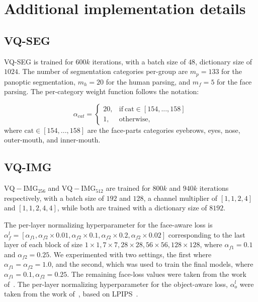 \documentclass[final]{cvpr}
\begin{document}
{\small


}
\clearpage
\appendix

\section{Additional implementation details}

\subsection{VQ-SEG}
VQ-SEG is trained for $600k$ iterations, with a batch size of $48$, dictionary size of $1024$. The number of segmentation categories per-group are $m_p=133$ for the panoptic segmentation, $m_h=20$ for the human parsing, and $m_f=5$ for the face parsing. The per-category weight function follows the notation:

\begin{equation}
    \alpha_{cat}=
    \begin{cases}
      20, & \text{if}\ \text{cat} \in [154,...,158] \\
      1, & \text{otherwise},
    \end{cases}
  \end{equation}
where $\text{cat} \in [154,...,158]$ are the face-parts categories eyebrows, eyes, nose, outer-mouth, and inner-mouth.


\subsection{VQ-IMG}
$\operatorname{VQ-IMG_{256}}$ and $\operatorname{VQ-IMG_{512}}$ are trained for $800k$ and $940k$ iterations respectively, with a batch size of $192$ and $128$, a channel multiplier of $[1,1,2,4]$ and $[1,1,2,4,4]$, while both are trained with a dictionary size of $8192$. 

The per-layer normalizing hyperparameter for the face-aware loss is $\alpha_f^l=[\alpha_{f1}, \alpha_{f2}\times0.01, \alpha_{f2}\times0.1, \alpha_{f2}\times0.2, \alpha_{f2}\times0.02]$ corresponding to the last layer of each block of size $1\times1, 7\times7, 28\times28, 56\times56, 128\times128$, where $\alpha_{f1}=0.1$ and $\alpha_{f2}=0.25$. We experimented with two settings, the first where $\alpha_{f1}=\alpha_{f2}=1.0$, and the second, which was used to train the final models, where $\alpha_{f1}=0.1,\alpha_{f2}=0.25$. The remaining face-loss values were taken from the work of~\cite{gafni2019live}.
The per-layer normalizing hyperparameter for the object-aware loss, $\alpha_o^l$ were taken from the work of~\cite{esser2021taming}, based on LPIPS~\cite{zhang2018unreasonable}.
\end{document}
